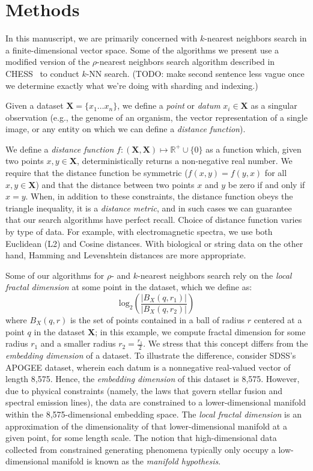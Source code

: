 \section{Methods}
\label{sec:methods}

In this manuscript, we are primarily concerned with $k$-nearest neighbors search in a finite-dimensional 
vector space. Some of the algorithms we present use a modified version of the $\rho$-nearest neighbors search 
algorithm described in CHESS~\cite{ishaq2019clustered} to conduct $k$-NN search. (TODO: make second sentence less 
vague once we determine exactly what we're doing with sharding and indexing.)

Given a dataset $\textbf{X} = \{x_1 \dots x_n\}$, we define a \emph{point} or \emph{datum} $x_i \in \textbf{X}$ as a singular observation (e.g., the genome of 
an organism, the vector representation of a single image, or any entity on which we can define a \emph{distance function}).

We define a \emph{distance function} $f : (\textbf{X}, \textbf{X}) \mapsto \mathbb{R}^+ \cup \{0\}$ as a function which, 
given two points $x, y \in \textbf{X}$, deterministically returns a non-negative real number. We require that the distance function 
be symmetric ($f(x, y) = f(y, x)$ for all $x, y \in \textbf{X}$) and that the distance between two points $x$ and $y$ be zero if and only if $x = y$. 
When, in addition to these constraints, the distance function obeys
the triangle inequality, it is a \emph{distance metric}, and in such cases we can guarantee that our search algorithms have perfect recall. 
Choice of distance function varies by type of data. For example, with electromagnetic spectra, we use both 
Euclidean (L2) and Cosine distances. With biological or string data on the other hand, Hamming and Levenshtein distances are more appropriate.


Some of our algorithms for $\rho$- and $k$-nearest neighbors search rely on the \emph{local fractal dimension} at some point in the dataset, 
which we define as: 
$$\text{log}_2 \left( \frac{|B_X(q, r_1)|}{|B_X(q, r_2)|} \right)$$
where $B_X(q, r)$ is the set of points contained in a ball of radius $r$ 
centered at a point $q$ in the dataset $\textbf{X}$; in this example, we compute fractal dimension for some radius $r_1$ and a smaller radius $r_2 = \frac{r_1}{2}$.
We stress that this concept differs from the \emph{embedding dimension} of a dataset. To illustrate the difference,
consider SDSS's APOGEE dataset, wherein each datum is a nonnegative real-valued vector of length 8,575. Hence, the \emph{embedding dimension} of this dataset is 8,575. 
However, due to physical constraints (namely, the laws that govern stellar fusion and spectral emission lines), the data are constrained to a lower-dimensional 
manifold within the 8,575-dimensional embedding space. The \emph{local fractal dimension} is an approximation of the dimensionality of that lower-dimensional manifold at a given point, for some length scale.
The notion that high-dimensional data collected from constrained generating phenomena typically only occupy a low-dimensional manifold is known as the \emph{manifold hypothesis}.


